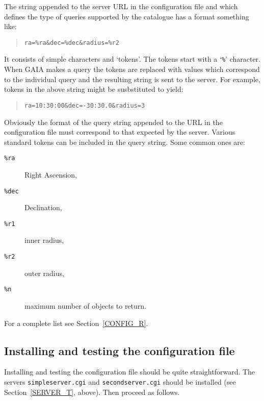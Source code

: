 \documentclass[twoside,11pt]{article}
\renewcommand{\_}{\texttt{\symbol{95}}}
\begin{document}
The string appended to the server URL in the configuration file and which
defines the type of queries supported by the catalogue has a format
something like:

\begin{quote}
\verb-ra=%ra&dec=%dec&radius=%r2-
\end{quote}

It consists of simple characters and `tokens'.  The tokens start with
a `{\tt \%}' character.  When GAIA makes a query the tokens are replaced
with values which correspond to the individual query and the resulting
string is sent to the server.  For example, tokens in the above string
might be susbstituted to yield:

\begin{quote}
\begin{verbatim}
ra=10:30:00&dec=-30:30.0&radius=3
\end{verbatim}
\end{quote}

Obviously the format of the query string appended to the URL in the
configuration file must correspond to that expected by the server.
Various standard tokens can be included in the query string.  Some common
ones are:

\begin{description}

  \item[{\tt \%ra}] Right Ascension,

  \item[{\tt \%dec}] Declination,

  \item[{\tt \%r1}] inner radius,

  \item[{\tt \%r2}] outer radius,

  \item[{\tt \%n}] maximum number of objects to return.

\end{description}

For a complete list see Section~\ref{CONFIG_R}.

\subsection{Installing and testing the configuration file}

Installing and testing the configuration file should be quite
straightforward.  The servers \newline
{\tt simpleserver.cgi} and {\tt secondserver.cgi} should be installed
(see Section~\ref{SERVER_T}, above).  Then proceed as follows.
\end{document}
